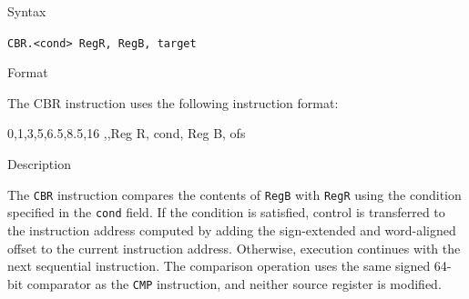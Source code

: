 %
%
\pagebreak
{}

\begin{iPageDescEntry}{Syntax}

	\texttt{CBR.<cond> RegR, RegB, target}
    
\end{iPageDescEntry}

\begin{iPageDescEntry}{Format}

The CBR instruction uses the following instruction format:
	
\begin{flushleft}
\drawInstrFormat
  	{0,1,3,5,6.5,8.5,16}
  	{\OpCodeGrpBR,\OpCodeCBR,Reg R, cond, Reg B, ofs }
\end{flushleft}
\end{iPageDescEntry}

\begin{iPageDescEntry}{Description}

The \texttt{CBR} instruction compares the contents of \texttt{RegB} with \texttt{RegR} using the condition specified in the \texttt{cond} field. If the condition is satisfied, control is transferred to the instruction address computed by adding the sign-extended and word-aligned offset to the current instruction address. Otherwise, execution continues with the next sequential instruction. The comparison operation uses the same signed 64-bit comparator as the \texttt{CMP} instruction, and neither source register is modified.
\end{iPageDescEntry}

